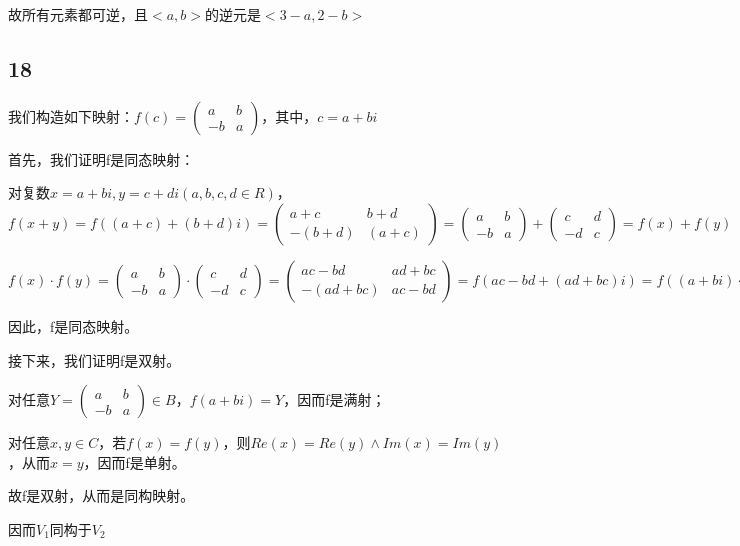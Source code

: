 \documentclass[UTF8]{ctexart}
\begin{document}
故所有元素都可逆，且$<a, b>$的逆元是$<3 - a, 2 - b>$

\subsection*{18}

我们构造如下映射：$f(c) = \begin{pmatrix}
    a & b\\
    -b & a
\end{pmatrix}$，其中，$c = a + bi$

首先，我们证明f是同态映射：

对复数$x = a + bi, y = c + di (a, b, c, d\in R)$，
$f(x + y) = f((a + c) + (b + d)i) = \begin{pmatrix}
    a + c & b + d\\
    -(b + d) & (a + c)
\end{pmatrix} = \begin{pmatrix}
    a & b\\
    -b & a
\end{pmatrix} + \begin{pmatrix}
    c & d\\
    -d & c
\end{pmatrix} = f(x) + f(y)$

$f(x)\cdot f(y) = \begin{pmatrix}
    a & b\\
    -b & a
\end{pmatrix}\cdot \begin{pmatrix}
    c & d\\
    -d & c
\end{pmatrix} = \begin{pmatrix}
    ac-bd & ad+bc\\
    -(ad+bc) & ac-bd
\end{pmatrix} = f(ac-bd + (ad + bc)i) = 
f((a + bi)\cdot (c + di)) = f(xy)$

因此，f是同态映射。

接下来，我们证明f是双射。

对任意$Y = \begin{pmatrix}
    a & b\\
    -b & a
\end{pmatrix}\in B$，$f(a+bi) = Y$，因而f是满射；

对任意$x, y\in C$，若$f(x) = f(y)$，则$Re(x) = Re(y)\land
Im(x) = Im(y)$，从而$x = y$，因而f是单射。

故f是双射，从而是同构映射。

因而$V_1$同构于$V_2$
\end{document}
